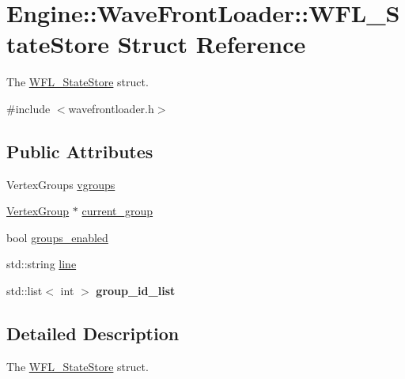 \hypertarget{structEngine_1_1WaveFrontLoader_1_1WFL__StateStore}{}\section{Engine\+:\+:Wave\+Front\+Loader\+:\+:W\+F\+L\+\_\+\+State\+Store Struct Reference}
\label{structEngine_1_1WaveFrontLoader_1_1WFL__StateStore}


The \hyperlink{structEngine_1_1WaveFrontLoader_1_1WFL__StateStore}{W\+F\+L\+\_\+\+State\+Store} struct.  




{\ttfamily \#include $<$wavefrontloader.\+h$>$}

\subsection*{Public Attributes}
\begin{DoxyCompactItemize}
\item 
Vertex\+Groups \hyperlink{structEngine_1_1WaveFrontLoader_1_1WFL__StateStore_a511e8e74a37201e4d835f2dc6ae195d8}{vgroups}
\item 
\hyperlink{classEngine_1_1VertexGroup}{Vertex\+Group} $\ast$ \hyperlink{structEngine_1_1WaveFrontLoader_1_1WFL__StateStore_a91a7b4fa6e5193b14bbbbf0cb1612354}{current\+\_\+group}
\item 
bool \hyperlink{structEngine_1_1WaveFrontLoader_1_1WFL__StateStore_a0e2eb463dfc9a370af2e65ccc792b82d}{groups\+\_\+enabled}
\item 
std\+::string \hyperlink{structEngine_1_1WaveFrontLoader_1_1WFL__StateStore_a53561766ac74d4e7929b6d8649e1fd97}{line}
\item 
\hypertarget{structEngine_1_1WaveFrontLoader_1_1WFL__StateStore_a5e87ca99b657c8fe2c94b5ef195ec17e}{}std\+::list$<$ int $>$ {\bfseries group\+\_\+id\+\_\+list}\label{structEngine_1_1WaveFrontLoader_1_1WFL__StateStore_a5e87ca99b657c8fe2c94b5ef195ec17e}

\end{DoxyCompactItemize}


\subsection{Detailed Description}
The \hyperlink{structEngine_1_1WaveFrontLoader_1_1WFL__StateStore}{W\+F\+L\+\_\+\+State\+Store} struct. 


